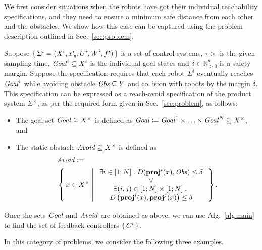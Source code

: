 We first consider situations when the robots have got their individual reachability specifications, and they need to ensure a minimum safe distance from each other and the obstacles.
We show how this case can be captured using the problem description outlined in Sec.~\ref{sec:problem}.

Suppose $\set{\Sigma^i=(X^i,x_{\mathsf{in}}^i,U^i,W^i,f^i)}$ is a set of control systems, $\tau>$ is the given sampling time, $\mathit{Goal}^i\subseteq X^i$ is the individual goal states and $\delta \in \mathbb{R}^p_{>0}$ is a safety margin.
Suppose the specification requires that each robot $\Sigma^i$ eventually reaches $\mathit{Goal}^i$ while avoiding obstacle $\mathit{Obs}\subseteq Y$ and collision with robots by the margin $\delta$.
This specification can be expressed as a reach-avoid specification of the product system $\Sigma^\times$, as per the required form given in Sec.~\ref{sec:problem}, as follows:
\begin{itemize}
	\item The goal set $\mathit{Goal}\subseteq X^\times$ is defined as $\mathit{Goal} \coloneqq \mathit{Goal}^1\times \ldots \times \mathit{Goal}^N \subseteq X^\times$, and
	\item The static obstacle $\mathit{Avoid}\subseteq X^\times$ is defined as 
		\begin{align}
			&\mathit{Avoid} \coloneqq\nonumber\\ 
				&\Set{ x\in X^\times | 
					\begin{array}{c}
						\exists i\in [1;N]\;.\; D(\mathbf{proj}^i(x),\mathit{Obs}) \leq \delta\\
						\vee\\
						 \exists (i,j)\in [1;N]\times [1;N]\;.\;\\ D\left(\mathbf{proj}^i(x),\mathbf{proj}^j(x)\right)\leq\delta
					\end{array}}.
		\end{align}
\end{itemize}
Once the sets $\mathit{Goal}$ and $\mathit{Avoid}$ are obtained as above, we can use Alg.~\ref{alg:main} to find the set of feedback controllers $\set{C^i}$.

In this category of problems, we consider the following three examples.


